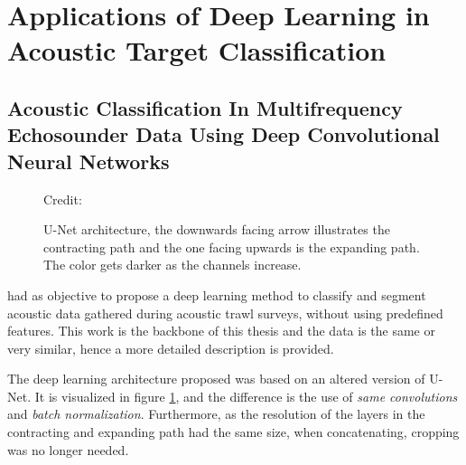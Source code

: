 \clearpage


\section{Applications of Deep Learning in Acoustic Target Classification}

\subsection{Acoustic Classification In Multifrequency Echosounder Data Using Deep Convolutional Neural Networks} \label{unet_paper_acoustic}
    
        \begin{figure}[H]
        \centering
        
        \caption[U-Net architecture]{U-Net architecture, the downwards facing arrow illustrates the contracting path and the one facing upwards is the expanding path. The color gets darker as the channels increase.}
      	\medskip 
        \label{unet__brautset_fig}
        \hspace*{15pt}\hbox{\scriptsize Credit: \citeauthor{brautaset2020acoustic}\cite{brautaset2020acoustic}}
    \end{figure}
    
    
    \citeauthor{brautaset2020acoustic}\cite{brautaset2020acoustic} had as objective to propose a deep learning method to classify and segment acoustic data gathered during acoustic trawl surveys, without using predefined features. This work is the backbone of this thesis and the data is the same or very similar, hence a more detailed description is provided\cite{korneliussen2016acoustic}.
    
    The deep learning architecture proposed was based on an altered version of \citeauthor{unet_ronneberger2015}\cite{unet_ronneberger2015} U-Net\cite{brautaset2020acoustic}. It is visualized in figure \ref{unet__brautset_fig}, and the difference is the use of \textit{same convolutions} and \textit{batch normalization}. Furthermore, as the resolution of the layers in the contracting and expanding path had the same size, when concatenating, cropping was no longer needed. 
    
